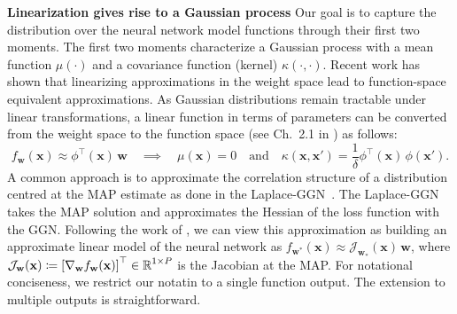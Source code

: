 \documentclass{article}
\newcommand{\weights}{\ensuremath{\mathbf{w}}}
\newcommand{\mbf}[1]{\mathbf{#1}}
\newcommand{\T}{\top}
\newcommand{\vx}{\mbf{x}}
\newcommand{\vw}{\mbf{w}}
\newcommand{\Jac}[2]{\mathcal{J}_{#1}(#2)}
\begin{document}
\textbf{Linearization gives rise to a Gaussian process}
Our goal is to capture the distribution over the neural network model functions through their first two moments. The first two moments characterize a Gaussian process with a mean function $\mu(\cdot)$ and a covariance function (kernel) $\kappa(\cdot,\cdot)$.
Recent work \cite{khan2019approximate,maddox2021fast} has shown that linearizing approximations in the weight space lead to function-space equivalent approximations.
As Gaussian distributions remain tractable under linear transformations, a linear function in terms of parameters can be converted from the weight space to the function space (see Ch.~2.1 in \cite{rasmussen2006gaussian}) as follows:
%
\begin{equation} \label{eq:weight_func}
f_\weights(\vx) \approx 
\phi^\top\!(\vx) \, \vw \quad\implies\quad \mu(\vx) = 0 \quad \text{and} \quad \kappa(\vx, \vx') = \frac{1}{\delta} \phi^\T\!(\vx) \, \phi(\vx').
\end{equation}
A common approach is to approximate the correlation structure of a distribution centred at the MAP estimate as done in the Laplace-GGN~\cite{khan2019approximate, daxberger2021laplace, maddox2021fast}. 
The Laplace-GGN takes the MAP solution and approximates the Hessian of the loss function
with the GGN.
Following the work of \citet{khan2019approximate}, we can view this approximation as building an approximate linear model of the neural network as $f_{\weights^*}(\vx) \approx 
\Jac{\weights_*}{\vx} \, \weights$, where $\Jac{\weights}{\vx} \coloneqq \left[ \nabla_\weights f_\weights(\vx)\right]^\top \in \R^{1 \times P}$ is the Jacobian at the MAP.
For notational conciseness, we %
restrict our notatin to a single function output. The extension to multiple outputs is straightforward.
\end{document}
